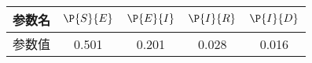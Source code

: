 \begin{tabular}{ccccc}
\hline
参数名&$\P{S}{E}$&$\P{E}{I}$&$\P{I}{R}$&$\P{I}{D}$\\
\hline
参数值&0.501&0.201&0.028&0.016\\
\hline
\end{tabular}